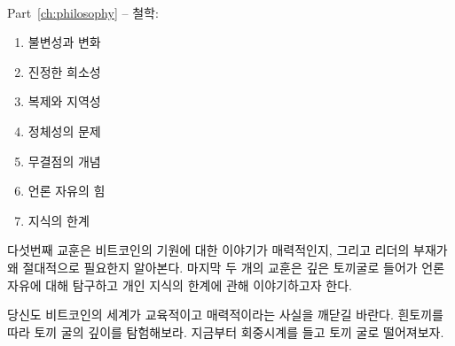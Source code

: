 ~

\begin{samepage}
Part~\ref{ch:philosophy} -- 철학:

\begin{enumerate}
  \item 불변성과 변화
  \item 진정한 희소성
  \item 복제와 지역성
  \item 정체성의 문제
  \item 무결점의 개념
  \item 언론 자유의 힘
  \item 지식의 한계
\end{enumerate}
\end{samepage}

다섯번째 교훈은 비트코인의 기원에 대한 이야기가 매력적인지, 그리고 리더의 부재가 왜 절대적으로 필요한지
알아본다. 마지막 두 개의 교훈은 깊은 토끼굴로 들어가 언론 자유에 대해 탐구하고 개인 지식의 한계에 관해 이야기하고자 한다. 

당신도 비트코인의 세계가 교육적이고 매력적이라는 사실을 깨닫길 바란다. 흰토끼를 따라 토끼 굴의 깊이를 탐험해보라.
지금부터 회중시계를 들고 토끼 굴로 떨어져보자.

